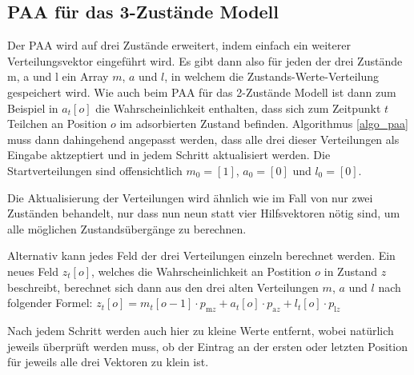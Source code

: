 \subsection{PAA für das 3-Zustände Modell}

Der PAA wird auf drei Zustände erweitert, indem einfach ein weiterer Verteilungsvektor eingeführt wird. Es gibt dann also für jeden der drei Zustände m, a und l ein Array $m$, $a$ und $l$, in welchem die Zustands-Werte-Verteilung gespeichert wird. Wie auch beim PAA für das 2-Zustände Modell ist dann zum Beispiel in $a_t[o]$ die Wahrscheinlichkeit enthalten, dass sich zum Zeitpunkt $t$ Teilchen an Position $o$ im adsorbierten Zustand befinden.
Algorithmus \ref{algo_paa} muss dann dahingehend angepasst werden, dass alle drei dieser Verteilungen als Eingabe aktzeptiert und in jedem Schritt aktualisiert werden.
Die Startverteilungen sind offensichtlich $m_0 = [1]$, $a_0 = [0]$ und $l_0=[0]$. 

Die Aktualisierung der Verteilungen wird ähnlich wie im Fall von nur zwei Zuständen behandelt, nur dass nun neun statt vier Hilfsvektoren nötig sind, um alle möglichen Zustandsübergänge zu berechnen. 

Alternativ kann jedes Feld der drei Verteilungen einzeln berechnet werden. Ein neues Feld $z_t[o]$, welches die Wahrscheinlichkeit an Postition $o$ in Zustand $z$ beschreibt, berechnet sich dann aus den drei alten Verteilungen $m$, $a$ und $l$ nach folgender Formel:
$z_t[o] = m_t[o-1] \cdot p_{\text{m}z} + a_t[o] \cdot p_{\text{a}z} + l_t[o] \cdot p_{\text{l}z} $


Nach jedem Schritt werden auch hier zu kleine Werte entfernt, wobei natürlich jeweils überprüft werden muss, ob der Eintrag an der ersten oder letzten Position für jeweils alle drei Vektoren zu klein ist.

% 



